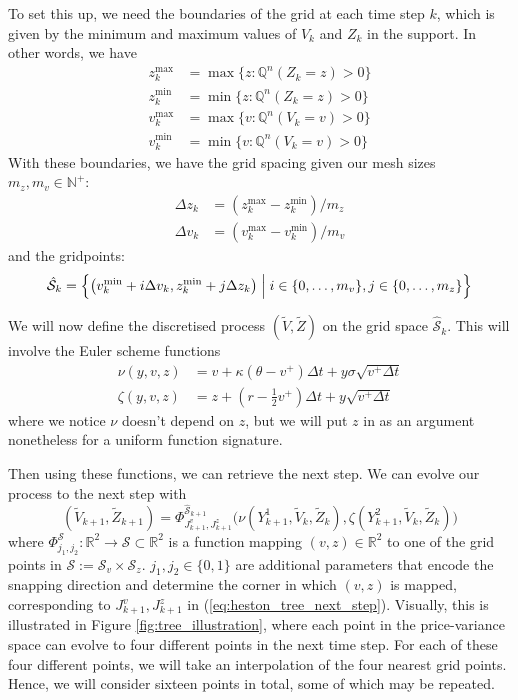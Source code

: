To set this up, we need the boundaries of the grid at each time step $k$, which is given by the minimum and maximum values of $V_k$ and $Z_k$ in the support. In other words, we have
\begin{align}
    z_k^\text{max} &= \max \{z : \mathbb Q^n (Z_k = z) > 0\} \\
    z_k^\text{min} &= \min \{z : \mathbb Q^n (Z_k = z) > 0\} \\
    v_k^\text{max} &= \max \{v : \mathbb Q^n (V_k = v) > 0\} \\
    v_k^\text{min} &= \min \{v : \mathbb Q^n (V_k = v) > 0\}
\end{align}
With these boundaries, we have the grid spacing given our mesh sizes $m_z, m_v \in \mathbb N^+$:
\begin{align}
    \Delta z_k &= (z_k^\text{max} - z_k^\text{min}) / m_z \\
    \Delta v_k &= (v_k^\text{max} - v_k^\text{min}) / m_v
\end{align}
and the gridpoints:
\begin{equation}
    \hat{\mathcal S}_k = \left\{\left(
    v_k^\text{min} + i\Delta v_k, z_k^\text{min} + j\Delta z_k \right) \Bigm | i \in \{0, \dots, m_v\}, j \in \{0, \dots, m_z\}\right\}
\end{equation}

We will now define the discretised process $(\tilde V, \tilde Z)$ on the grid space $\hat {\mathcal S}_k$. This will involve the Euler scheme functions
\begin{align}
    \nu(y, v, z) &= v + \kappa (\theta - v^+) \Delta t + y \sigma \sqrt{v^+ \Delta t} \\
    \zeta(y, v, z) &= z + (r - \tfrac 12 v^+)\Delta t + y \sqrt{v^+\Delta t}
\end{align}
where we notice $\nu$ doesn't depend on $z$, but we will put $z$ in as an argument nonetheless for a uniform function signature.

Then using these functions, we can retrieve the next step. We can evolve our process to the next step with
\begin{equation}
    (\tilde V_{k+1}, \tilde Z_{k+1}) = \Phi_{J^v_{k+1}, J^z_{k+1}}^{\hat {\mathcal S}_{k+1}}\big(\nu (Y_{k+1}^1, \tilde V_k, \tilde Z_k), \zeta (Y_{k+1}^2, \tilde V_k, \tilde Z_k)\big)
\label{eq:heston_tree_next_step}
\end{equation}
where $\Phi_{j_1, j_2}^{\mathcal S} : \mathbb R^2 \to \mathcal S \subset \mathbb R^2$ is a function mapping $(v, z) \in \mathbb R^2$ to one of the grid points in $\mathcal S := \mathcal S_v \times \mathcal S_z$. $j_1, j_2 \in \{0, 1\}$ are additional parameters that encode the snapping direction and determine the corner in which $(v, z)$ is mapped, corresponding to $J^v_{k+1}, J^z_{k+1}$ in (\ref{eq:heston_tree_next_step}). Visually, this is illustrated in Figure \ref{fig:tree_illustration}, where each point in the price-variance space can evolve to four different points in the next time step. For each of these four different points, we will take an interpolation of the four nearest grid points. Hence, we will consider sixteen points in total, some of which may be repeated.

